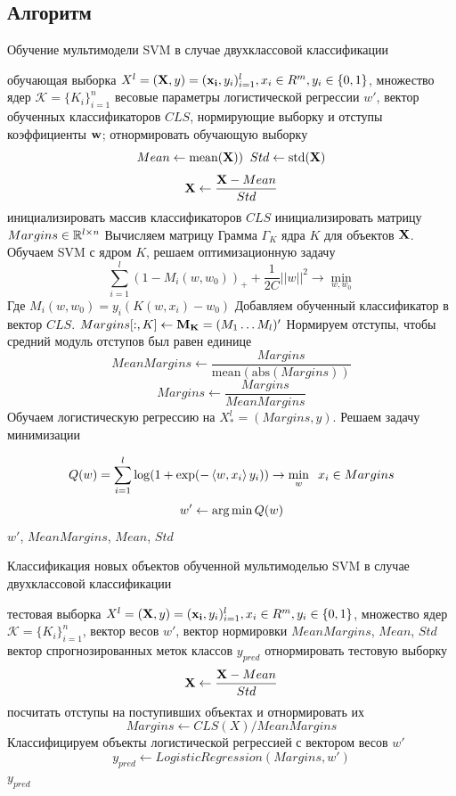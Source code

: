 \documentclass[12pt,twoside]{article}
\newcommand{\lto}{\leftarrow}
\theoremstyle{plain}
\theoremstyle{remark}
\theoremstyle{definition}
\begin{document}
\newpage

\subsection{Алгоритм}

\begin{algorithm}[!h]
	\caption{Обучение мультимодели SVM в случае двухклассовой классификации}
	\label{alg:svm}
	\begin{algorithmic}
	\REQUIRE обучающая выборка $X^l = (\mathbf{X}, y) = (\mathbf{x_i}, y_i)_{i=1}^l, x_i \in R^m, y_i \in \{0, 1\}$, множество ядер $\mathcal{K} = \{K_i\}_{i=1}^n$
	\ENSURE весовые параметры логистической регрессии $w'$, вектор обученных классификаторов $CLS$, нормирующие выборку и отступы коэффициенты
	$\mathbf{w}$;
	\BEGIN
		\STATE отнормировать обучающую выборку 
		$$
		Mean \lto \mathrm{mean}(\v{X}))\;\; Std \lto \mathrm{std}(\v{X})
		$$
		$$
		\v{X} \lto \frac{\v{X} - Mean}{Std}
		$$
		\STATE инициализировать массив классификаторов $CLS$
		\STATE инициализировать матрицу $Margins \in \R^{l\times n}$
			\STATE Вычисляем матрицу Грамма $\Gamma_K$ ядра $K$ для объектов $\mathbf{X}$.
			\STATE Обучаем SVM с ядром $K$, решаем оптимизационную задачу
			$$
			\sum_{i=1}^l (1 - M_i(w, w_0))_+ + \frac{1}{2C}||w||^2 \to \min_{w, w_0}
			$$
			Где $M_i(w, w_0) = y_i(K(w, x_i) - w_0)$
			\STATE Добавляем обученный классификатор в вектор $CLS$.
			\STATE $Margins[:, K] \lto \v{M_K} = (M_1\ldots M_l)'$
		\ENDFOR
		\STATE Нормируем отступы, чтобы средний модуль отступов был равен единице 
			$$
			MeanMargins \lto \frac{Margins}{\mathrm{mean}(\mathrm{abs}(Margins))}
			$$
			$$
			Margins \lto \frac{Margins}{MeanMargins}
			$$
		\STATE Обучаем логистическую регрессию на $X^l_* = (Margins, y)$. Решаем задачу минимизации
		
		$$
		Q(w) = \sum_{i=1}^l \log(1 + \mathrm{exp}(-\rbrs{w, x_i}y_i)) \to \min_w\;\;x_i \in Margins
		$$
		$$
		w' \lto \argmin{Q(w)}
		$$
		\RETURN $w'$, $MeanMargins$, $Mean$, $Std$
	\end{algorithmic}
	\end{algorithm}
\begin{algorithm}[!h]
	\caption{Классификация новых объектов обученной мультимоделью SVM в случае двухклассовой классификации}
	\label{alg:svm}
	\begin{algorithmic}
	\REQUIRE тестовая выборка $X^l = (\mathbf{X}, y) = (\mathbf{x_i}, y_i)_{i=1}^l, x_i \in R^m, y_i \in \{0, 1\}$, множество ядер $\mathcal{K} = \{K_i\}_{i=1}^n$, вектор весов $w'$, вектор нормировки $MeanMargins$, $Mean$, $Std$
	\ENSURE вектор спрогнозированных меток классов $y_{pred}$
	\BEGIN
		\STATE отнормировать тестовую выборку 
		$$
		\v{X} \lto \frac{\v{X} - Mean}{Std}
		$$
		\STATE посчитать отступы на поступивших объектах и отнормировать их
		$$
		Margins \lto CLS(X) / MeanMargins
		$$
		\STATE Классифицируем объекты логистической регрессией с вектором весов $w'$
		$$
		y_{pred} \lto LogisticRegression(Margins, w')
		$$
		\RETURN $y_{pred}$
	\end{algorithmic}
	\end{algorithm}

\newpage



\end{document}
